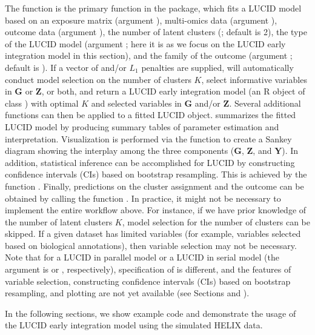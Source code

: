 The function  is the primary function in the package, which fits a LUCID model based on an exposure matrix (argument ), multi-omics data (argument ), outcome data (argument ), the number of latent clusters (; default is 2), the type of the LUCID model (argument ; here it is  as we focus on the LUCID early integration model in this section), and the family of the outcome (argument ; default is ). If a vector of  and/or $L_1$ penalties are supplied,  will automatically conduct model selection on the number of clusters $K$, select informative variables in $\bm G$ or $\bm Z$, or both, and return a LUCID early integration model (an R object of class ) with optimal $K$ and selected variables in $\bm G$ and/or $\bm Z$. Several additional functions can then be applied to a fitted LUCID object.  summarizes the fitted LUCID model by producing summary tables of parameter estimation and interpretation. Visualization is performed via the  function to create a Sankey diagram showing the interplay among the three components ($\bm G$, $\bm Z$, and $\bm Y$). In addition, statistical inference can be accomplished for LUCID by constructing confidence intervals (CIs) based on bootstrap resampling. This is achieved by the function . Finally, predictions on the cluster assignment and the outcome can be obtained by calling the function . In practice, it might not be necessary to implement the entire workflow above. For instance, if we have prior knowledge of the number of latent clusters $K$, model selection for the number of clusters can be skipped. If a given dataset has limited variables (for example, variables selected based on biological annotations), then variable selection may not be necessary. Note that for a LUCID in parallel model or a LUCID in serial model (the argument  is  or , respectively), specification of  is different, and the features of variable selection, constructing confidence intervals (CIs) based on bootstrap resampling, and plotting are not yet available (see Sections  and ).

In the following sections, we show example code and demonstrate the usage of the LUCID early integration model using the simulated HELIX data.



